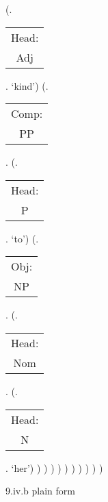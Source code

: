 \documentclass[12pt,letterpaper]{article}
\begin{document}
\begin{figure}
\begin{center}
\begin{parsetree}
			(.\begin{tabular}{c}Head:\\Adj\end{tabular}. `kind')
			(.\begin{tabular}{c}Comp:\\PP\end{tabular}.
			(.\begin{tabular}{c}Head:\\P\end{tabular}. `to')
			(.\begin{tabular}{c}Obj:\\NP\end{tabular}. 
			(.\begin{tabular}{c}Head:\\Nom\end{tabular}. 
			(.\begin{tabular}{c}Head:\\N\end{tabular}. `her')
			)
			)
			)
			)
			)
			)
			)
			)
			)
			)
			
		\end{parsetree}
		\hfill \break \hfill \break
		9.iv.b plain form
	\end{center}
\end{figure}
\end{document}
